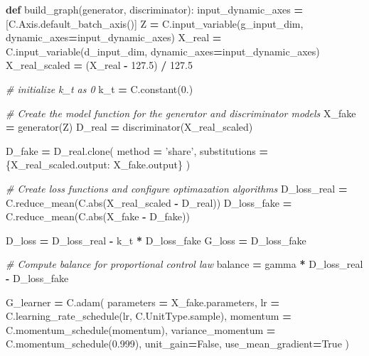 \documentclass[]{book}
\newenvironment{Shaded}{\begin{snugshade}}{\end{snugshade}}
\newcommand{\KeywordTok}[1]{\textcolor[rgb]{0.13,0.29,0.53}{\textbf{#1}}}
\newcommand{\DecValTok}[1]{\textcolor[rgb]{0.00,0.00,0.81}{#1}}
\newcommand{\FloatTok}[1]{\textcolor[rgb]{0.00,0.00,0.81}{#1}}
\newcommand{\StringTok}[1]{\textcolor[rgb]{0.31,0.60,0.02}{#1}}
\newcommand{\CommentTok}[1]{\textcolor[rgb]{0.56,0.35,0.01}{\textit{#1}}}
\newcommand{\VariableTok}[1]{\textcolor[rgb]{0.00,0.00,0.00}{#1}}
\newcommand{\OperatorTok}[1]{\textcolor[rgb]{0.81,0.36,0.00}{\textbf{#1}}}
\newcommand{\BuiltInTok}[1]{#1}
\newcommand{\NormalTok}[1]{#1}
\theoremstyle{definition}
\theoremstyle{definition}
\theoremstyle{definition}
\theoremstyle{remark}
\begin{document}
\begin{Shaded}
\begin{Highlighting}[]
\KeywordTok{def}\NormalTok{ build_graph(generator, discriminator):}
\NormalTok{    input_dynamic_axes }\OperatorTok{=}\NormalTok{ [C.Axis.default_batch_axis()]}
\NormalTok{    Z }\OperatorTok{=}\NormalTok{ C.input_variable(g_input_dim, dynamic_axes}\OperatorTok{=}\NormalTok{input_dynamic_axes)}
\NormalTok{    X_real }\OperatorTok{=}\NormalTok{ C.input_variable(d_input_dim, dynamic_axes}\OperatorTok{=}\NormalTok{input_dynamic_axes)}
\NormalTok{    X_real_scaled }\OperatorTok{=}\NormalTok{ (X_real }\OperatorTok{-} \FloatTok{127.5}\NormalTok{) }\OperatorTok{/} \FloatTok{127.5}
    
    \CommentTok{# initialize k_t as 0}
\NormalTok{    k_t }\OperatorTok{=}\NormalTok{ C.constant(}\DecValTok{0}\NormalTok{.)}
    
    \CommentTok{# Create the model function for the generator and discriminator models}
\NormalTok{    X_fake }\OperatorTok{=}\NormalTok{ generator(Z)}
\NormalTok{    D_real }\OperatorTok{=}\NormalTok{ discriminator(X_real_scaled)}
    
\NormalTok{    D_fake }\OperatorTok{=}\NormalTok{ D_real.clone(}
\NormalTok{        method }\OperatorTok{=} \StringTok{'share'}\NormalTok{,}
\NormalTok{        substitutions }\OperatorTok{=}\NormalTok{ \{X_real_scaled.output: X_fake.output\}}
\NormalTok{    )}
    
    \CommentTok{# Create loss functions and configure optimazation algorithms}
\NormalTok{    D_loss_real }\OperatorTok{=}\NormalTok{ C.reduce_mean(C.}\BuiltInTok{abs}\NormalTok{(X_real_scaled }\OperatorTok{-}\NormalTok{ D_real))}
\NormalTok{    D_loss_fake }\OperatorTok{=}\NormalTok{ C.reduce_mean(C.}\BuiltInTok{abs}\NormalTok{(X_fake }\OperatorTok{-}\NormalTok{ D_fake))}
    
\NormalTok{    D_loss }\OperatorTok{=}\NormalTok{ D_loss_real }\OperatorTok{-}\NormalTok{ k_t }\OperatorTok{*}\NormalTok{ D_loss_fake}
\NormalTok{    G_loss }\OperatorTok{=}\NormalTok{ D_loss_fake}
    
    \CommentTok{# Compute balance for proportional control law}
\NormalTok{    balance }\OperatorTok{=}\NormalTok{ gamma }\OperatorTok{*}\NormalTok{ D_loss_real }\OperatorTok{-}\NormalTok{ D_loss_fake}
    
\NormalTok{    G_learner }\OperatorTok{=}\NormalTok{ C.adam(}
\NormalTok{            parameters }\OperatorTok{=}\NormalTok{ X_fake.parameters,}
\NormalTok{            lr }\OperatorTok{=}\NormalTok{ C.learning_rate_schedule(lr, C.UnitType.sample),}
\NormalTok{            momentum }\OperatorTok{=}\NormalTok{ C.momentum_schedule(momentum),}
\NormalTok{            variance_momentum }\OperatorTok{=}\NormalTok{ C.momentum_schedule(}\FloatTok{0.999}\NormalTok{), }
\NormalTok{            unit_gain}\OperatorTok{=}\VariableTok{False}\NormalTok{,}
\NormalTok{            use_mean_gradient}\OperatorTok{=}\VariableTok{True}
\NormalTok{    )}
    

\end{Highlighting}
\end{Shaded}
\end{document}
